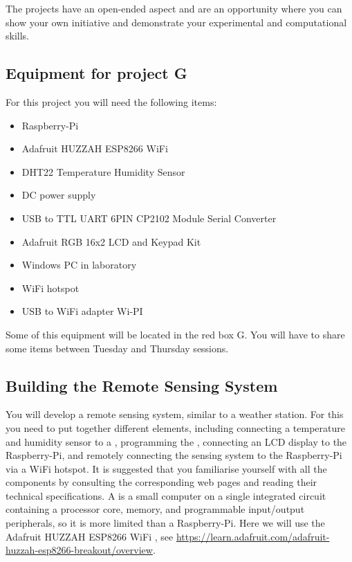 The projects have an open-ended aspect and are an opportunity where you can show your own initiative and demonstrate your experimental and computational skills. 

\subsection{Equipment for project G}

For this project you will need the following items:
\begin{itemize}
\item Raspberry-Pi
\item Adafruit HUZZAH ESP8266 WiFi  \microcontroller
\item DHT22 Temperature Humidity Sensor 
\item DC power supply
\item USB  to TTL UART 6PIN CP2102 Module Serial Converter
\item Adafruit RGB 16x2 LCD and Keypad Kit 
\item Windows PC in laboratory
\item WiFi hotspot 
\item USB to WiFi adapter Wi-PI
\end{itemize}
Some of this equipment will be located in the red box G. You will have to share some items between Tuesday and Thursday sessions. 


\subsection{Building the Remote Sensing System}

You will develop a remote sensing system, similar to a weather station.
For this you need to put together different elements, including 
connecting a temperature and humidity sensor to a \microcontroller, 
programming the \microcontroller,
connecting an LCD display to the Raspberry-Pi,
and remotely connecting the sensing system to the Raspberry-Pi via
a WiFi hotspot. It is suggested that you familiarise yourself with all the components
by consulting the corresponding web pages and reading their  technical specifications.
A \microcontroller is a small computer on a single integrated circuit containing a processor core, memory, and programmable input/output peripherals,  so it is more limited than a 
Raspberry-Pi. Here we will use the Adafruit HUZZAH ESP8266 WiFi  \microcontroller,
see \url{https://learn.adafruit.com/adafruit-huzzah-esp8266-breakout/overview}.

